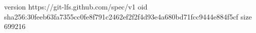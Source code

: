 version https://git-lfs.github.com/spec/v1
oid sha256:30feeb63fa7355cc0fe8f791c2462ef2f2f4d93e4a680bd71fcc9444e884f5cf
size 699216
